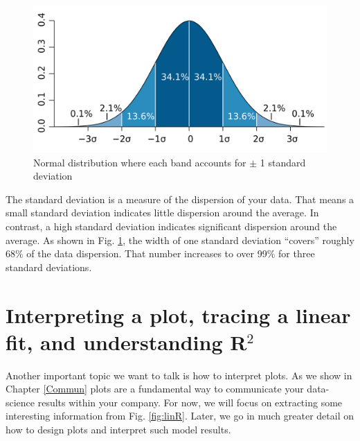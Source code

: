\begin{figure}[h]
	\begin{center}
			\includegraphics[scale=0.13]{Parts/ch2/stdch2}
	\end{center}
	\caption{Normal distribution where each band accounts for $\pm$ 1 standard deviation}
	\label{fig:std}
\end{figure} 

\newpage

The standard deviation is a measure of the dispersion of your data. That means a small standard deviation indicates little dispersion around the average. In contrast, a high standard deviation indicates significant dispersion around the average. As shown in Fig. \ref{fig:std}, the width of one standard deviation ``covers'' roughly 68$\%$ of the data dispersion. That number increases to over 99$\%$ for three standard deviations.

\section{Interpreting a plot, tracing a linear fit, and understanding R$^2$}

Another important topic we want to talk is how to interpret plots. As we show in Chapter \ref{Commun} plots are a fundamental way to communicate your data-science results within your company. For now, we will focus on extracting some interesting information from Fig. \ref{fig:linR}. Later, we go in much greater detail on how to design plots and interpret such model results.

